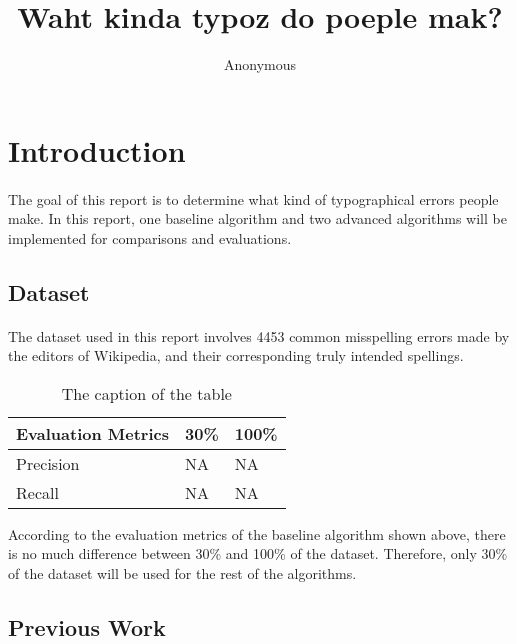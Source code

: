 \documentclass[11pt]{article}
\title{Waht kinda typoz do poeple mak?}
\author
{Anonymous}
\begin{document}
\maketitle


\section{Introduction}

\paragraph{} The goal of this report is to determine what kind of typographical errors people make. In this report, one baseline algorithm and two advanced algorithms will be implemented for comparisons and evaluations.

\subsection{Dataset}

\paragraph{} The dataset used in this report involves 4453 common misspelling errors made by the editors of Wikipedia, and their corresponding truly intended spellings.

\begin{table}[h]
 \begin{center}
\begin{tabular}{| l | l | l |}

      \hline
      Evaluation Metrics & 30\% & 100\% \\
      \hline\hline
      Precision & NA & NA \\
      Recall & NA & NA \\
      \hline

\end{tabular}
\caption{The caption of the table}\label{table1}
 \end{center}
\end{table}

According to the evaluation metrics of the baseline algorithm shown above, there is no much difference between 30\% and 100\% of the dataset. Therefore, only 30\% of the dataset will be used for the rest of the algorithms.

\subsection{Previous Work}
\end{document}
